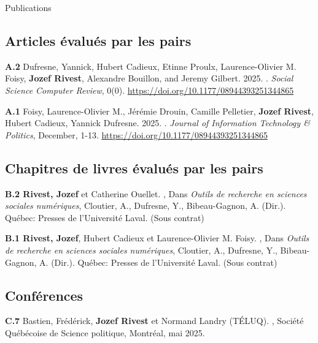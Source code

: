 \documentclass{resume} %
\begin{document}
\begin{rSection}{Publications}

\subsection*{Articles évalués par les pairs}

{\textbf{A.2} Dufresne, Yannick, Hubert Cadieux, Etinne Proulx,
Laurence-Olivier M. Foisy, \textbf{Jozef Rivest}, Alexandre Bouillon,
and Jeremy Gilbert. 2025. . \textit{Social
Science Computer Review}, 0(0).
\url{https://doi.org/10.1177/08944393251344865}}

{\textbf{A.1} Foisy, Laurence-Olivier M., Jérémie Drouin, Camille
Pelletier, \textbf{Jozef Rivest}, Hubert Cadieux, Yannick Dufresne.
2025. . \textit{Journal of Information
Technology \& Politics}, December, 1-13.
\url{https://doi.org/10.1177/08944393251344865}}

\subsection*{Chapitres de livres évalués par les pairs}

{\textbf{B.2 Rivest, Jozef} et Catherine Ouellet. , Dans \textit{Outils de recherche en sciences sociales numériques}, Cloutier, A., Dufresne, Y., Bibeau-Gagnon, A. (Dir.). Québec: Presses de l'Université Laval. (Sous contrat)} \par

{\textbf{B.1 Rivest, Jozef}, Hubert Cadieux et Laurence-Olivier M. Foisy. , Dans \textit{Outils de recherche en sciences sociales numériques}, Cloutier, A., Dufresne, Y., Bibeau-Gagnon, A. (Dir.). Québec: Presses de l'Université Laval.} (Sous contrat) \par

\subsection*{Conférences}

{\textbf{C.7} Bastien, Frédérick, \textbf{Jozef Rivest} et Normand Landry (TÉLUQ). , Société Québécoise de Science politique, Montréal, mai 2025.}


\end{rSection}
\end{document}
